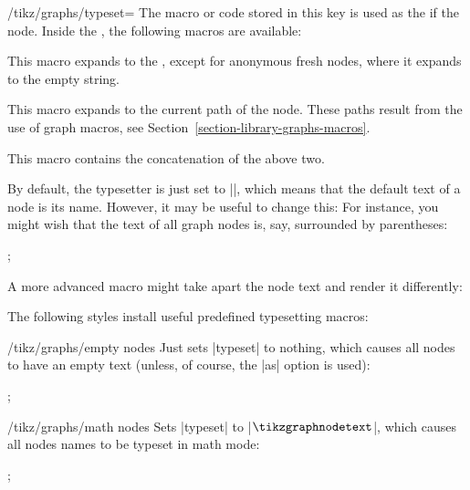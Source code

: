 \begin{itemize}
  \begin{key}{/tikz/graphs/typeset=}
    The macro or code stored in this key is used as the
     if the node. Inside the , the following
    macros are available:
    \begin{command}{\tikzgraphnodetext}
      This macro expands to the , except for
      anonymous fresh nodes, where it expands to the empty string.
    \end{command}
    \begin{command}{\tikzgraphnodepath}
      This macro expands to the current path of the node. These
      paths result from the use of graph macros, see
      Section~\ref{section-library-graphs-macros}.
    \end{command}
    \begin{command}{\tikzgraphnodefullname}
      This macro contains the concatenation of the above two.
    \end{command}
  \end{key}
  By default, the typesetter is just set to |\tikzgraphnodetext|,
  which means that the default text of a node is its name. However,
  it may be useful to change this: For instance, you might wish that
  the text of all graph nodes is, say, surrounded by parentheses:
  \begin{codeexample}[]
\tikz {};
  \end{codeexample}
  A more advanced macro might take apart the node text and render it
  differently: 
  The following styles install useful predefined typesetting macros:
  \begin{key}{/tikz/graphs/empty nodes}
    Just sets |typeset| to nothing, which causes all nodes to have an
    empty text (unless, of course, the |as| option is used):
    \begin{codeexample}[]
\tikz {};  
    \end{codeexample}
  \end{key}
  \begin{key}{/tikz/graphs/math nodes}
    Sets |typeset| to |$\tikzgraphnodetext$|, which causes all nodes
    names to be typeset in math mode:
    \begin{codeexample}[]
\tikz {};  
    \end{codeexample}
  \end{key}
\end{itemize}

